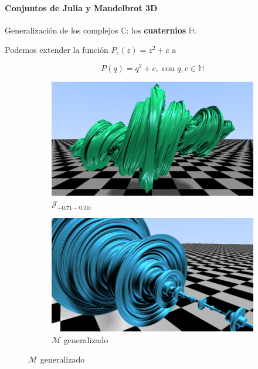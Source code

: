 \begin{frame}{\insertsectionhead}
\framesubtitle{Conjuntos de Julia y Mandelbrot 3D}
{\large 
Generalización de los complejos $\mathbb C$: los \textbf{cuaternios} $\mathbb H$.

\pause

Podemos extender la función $P_c(z)=z^2+c$ a 

$$
P(q) = q^2 + c,\text{ con }q,c\in\mathbb H
$$

}

    \begin{figure}[ht!]
    \hspace{\fill}
    \begin{subfigure}[b]{0.4\textwidth}
      \includegraphics[width=\textwidth]{screenshots/julia-3D-frontal-2.png}
      \caption*{$\mathcal{J}_{-0.71-0.31i}$}
    \end{subfigure}
    \hspace{\fill}
    \begin{subfigure}[b]{0.4\textwidth}
      \includegraphics[width=\textwidth]{screenshots/mandelbrot-1.png}
      \caption*{$\mathcal{M}$ generalizado}
    \end{subfigure}
    \hspace{\fill}
    \end{figure}
\end{frame}

